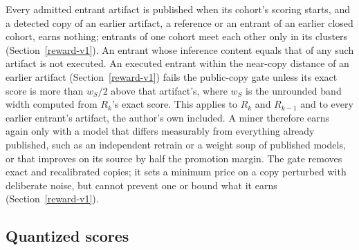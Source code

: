 Every admitted entrant artifact is published when its cohort's scoring starts,
and a detected copy of an earlier artifact, a reference or an entrant of an
earlier closed cohort, earns nothing; entrants of one cohort meet each other only in its
clusters (Section~\ref{reward-v1}). An entrant whose inference content equals
that of any such artifact is not executed. An executed entrant within the
near-copy distance of an earlier artifact (Section~\ref{reward-v1}) fails the public-copy gate unless its exact score is
more than \(w_S/2\) above that artifact's, where \(w_S\) is the unrounded band
width computed from \(R_k\)'s exact score. This applies to
\(R_k\) and \(R_{k-1}\) and to every earlier entrant's artifact, the author's own included. A miner therefore earns again only with a model that differs
measurably from everything already published, such as an independent retrain or
a weight soup of published models, or that improves on its source by half the
promotion margin. The gate removes exact and recalibrated copies; it sets a
minimum price on a copy perturbed with deliberate noise, but cannot prevent one
or bound what it earns (Section~\ref{reward-v1}).

\subsection{Quantized scores}\label{quantized-scores}

